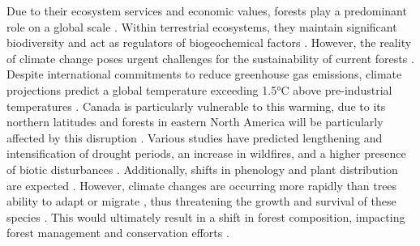 Due to their ecosystem services and economic values, forests play a predominant role on a global scale \citep{Balvanera2006Quantifyingevidence}. 
Within terrestrial ecosystems, they maintain significant biodiversity and act as regulators of biogeochemical factors \citep{Pawson2013Plantationforests}. 
However, the reality of climate change poses urgent challenges for the sustainability of current forests \citep{McKenney2009Climatechange,Messier2022Warningnatural,Seidl2017Forestdisturbances,Trumbore2015Foresthealth}. 
Despite international commitments to reduce greenhouse gas emissions, climate projections predict a global temperature exceeding 1.5°C above pre-industrial temperatures \citep{Matthews2022Currentglobal}. 
Canada is particularly vulnerable to this warming, due to its northern latitudes \citep{Alo2008Potentialfuture,Bush2019Canadachanging} and forests in eastern North America will be particularly affected by this disruption \citep{Park2014Canboreal,Mahony2017closerlook,Messier2022Warningnatural,Sittaro2017Treerange}. 
Various studies have predicted lengthening and intensification of drought periods, an increase in wildfires, and a higher presence of biotic disturbances \citep{Gatti2021Amazoniacarbon,Heidari2021Effectsclimate,Joyce2013Climatechange,Parmesan2007Influencesspecies}. 
Additionally, shifts in phenology and plant distribution are expected \citep{Aitken2008Adaptationmigration,Chuine2010Whydoes,Gray2013Trackingsuitable,Zhu2012Failuremigrate}. 
However, climate changes are occurring more rapidly than trees ability to adapt or migrate \citep{Aitken2008Adaptationmigration,Harrison2020Plantcommunity,Loarie2009velocityclimate,Messier2022Warningnatural,Williams2013Preparingclimate,Vitt2010Assistedmigration}, thus threatening the growth and survival of these species \citep{Sittaro2017Treerange,Woodall2018Decadalchanges,Zhu2012Failuremigrate}.
This would ultimately result in a shift in forest composition, impacting forest management and conservation efforts \citep{Chmura2011Forestresponses,Lo2011Linkingclimate,McKenney2009Climatechange}.

